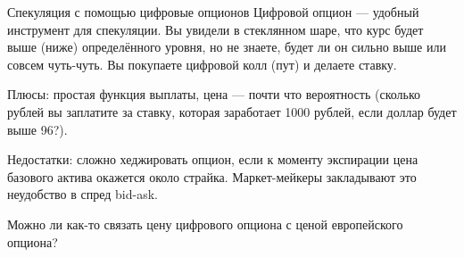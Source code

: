 \documentclass{beamer}
\newcommand{\usdrubstrike}{96}
\begin{document}
\begin{frame}{Спекуляция с помощью цифровые опционов}
\justify
Цифровой опцион --- удобный инструмент для спекуляции. Вы увидели в стеклянном шаре,
что курс будет выше (ниже) определённого уровня, но не знаете, будет ли он сильно выше
или совсем чуть-чуть. Вы покупаете цифровой колл (пут) и делаете ставку.

\justify
Плюсы: простая функция выплаты, цена --- почти что вероятность (сколько рублей вы 
заплатите за ставку, которая заработает 1000 рублей, если доллар будет выше \usdrubstrike?). 

\justify
Недостатки: сложно хеджировать опцион, если к моменту экспирации цена базового актива окажется около страйка. Маркет-мейкеры закладывают это неудобство в спред bid-ask.

\justify
Можно ли как-то связать цену цифрового опциона с ценой европейского опциона?
\end{frame}

\newcommand{\leftstrikeA}{95.5}
\newcommand{\leftstrikeB}{95.75}
\newcommand{\leftstrikeC}{95.95}
\newcommand{\rightstrikeA}{96.5}
\newcommand{\rightstrikeB}{96.25}
\newcommand{\rightstrikeC}{96.05}
\end{document}
